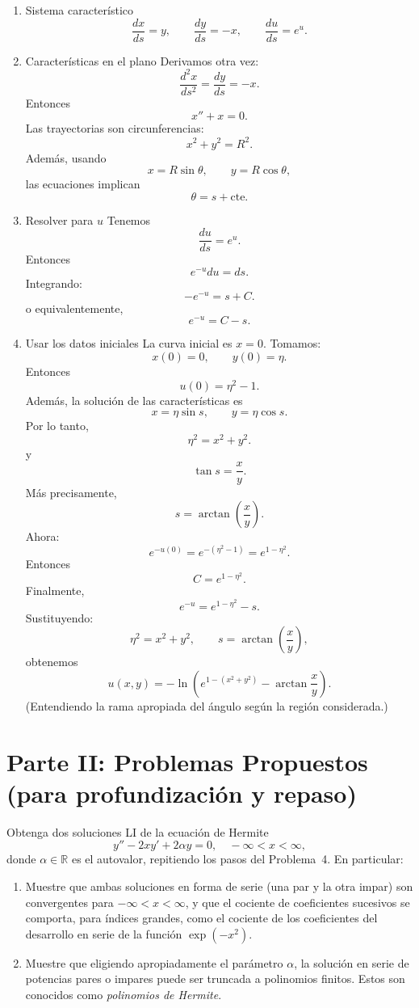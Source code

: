 \documentclass[11pt,spanish]{article}
\newcommand{\sca}[1]{\mathbb{#1}}
\newcounter{problema}
\newcommand{\prob}{\stepcounter{problema} \vspace{.5cm} \noindent{\bf Problema \arabic{problema}: }}
\begin{document}
\begin{enumerate}
\item Sistema característico
$$
\frac{dx}{ds}=y,
\qquad
\frac{dy}{ds}=-x,
\qquad
\frac{du}{ds}=e^u.
$$

\item Características en el plano
Derivamos otra vez:
$$
\frac{d^2x}{ds^2}
=
\frac{dy}{ds}
=
-x.
$$
Entonces
$$
x''+x=0.
$$
Las trayectorias son circunferencias:
$$
x^2+y^2=R^2.
$$
Además, usando
$$
x=R\sin\theta,
\qquad
y=R\cos\theta,
$$
las ecuaciones implican
$$
\theta=s+\text{cte}.
$$

\item Resolver para $u$
Tenemos
$$
\frac{du}{ds}=e^u.
$$
Entonces
$$
e^{-u}du=ds.
$$
Integrando:
$$
-e^{-u}=s+C.
$$
o equivalentemente,
$$
e^{-u}=C-s.
$$

\item Usar los datos iniciales
La curva inicial es $x=0$. Tomamos:
$$
x(0)=0,
\qquad
y(0)=\eta.
$$
Entonces
$$
u(0)=\eta^2-1.
$$
Además, la solución de las características es
$$
x=\eta\sin s,
\qquad
y=\eta\cos s.
$$
Por lo tanto,
$$
\eta^2=x^2+y^2.
$$
y
$$
\tan s=\frac{x}{y}.
$$
Más precisamente,
$$
s=\arctan\left(\frac{x}{y}\right).
$$
Ahora:
$$
e^{-u(0)}
=
e^{-(\eta^2-1)}
=
e^{1-\eta^2}.
$$
Entonces
$$
C=e^{1-\eta^2}.
$$
Finalmente,
$$
e^{-u}
=
e^{1-\eta^2}-s.
$$
Sustituyendo:
$$
\eta^2=x^2+y^2,
\qquad
s=\arctan\left(\frac{x}{y}\right),
$$
obtenemos
$$
\boxed{
u(x,y)
=
-\ln\left(
e^{1-(x^2+y^2)}
-
\arctan\frac{x}{y}
\right)
}.
$$
(Entendiendo la rama apropiada del ángulo según la región considerada.)
\end{enumerate}

\section*{Parte II: Problemas Propuestos (para profundización y repaso)}


\prob Obtenga dos soluciones LI de la ecuación de Hermite
\[
y'' - 2xy' + 2\alpha y = 0, \quad -\infty<x<\infty,
\]
donde $\alpha\in\sca{R}$ es el autovalor, repitiendo los pasos del Problema~4. En particular:
\begin{enumerate}
\item Muestre que ambas soluciones en forma de serie (una par y la otra impar) son convergentes para $-\infty<x<\infty$, y que el cociente de coeficientes sucesivos se comporta, para índices grandes, como el cociente de los coeficientes del desarrollo en serie de la función $\exp(-x^2)$.
\item Muestre que eligiendo apropiadamente el parámetro $\alpha$, la solución en serie de potencias pares o impares puede ser truncada a polinomios finitos. Estos son conocidos como \emph{polinomios de Hermite}.
\end{enumerate}
\end{document}
